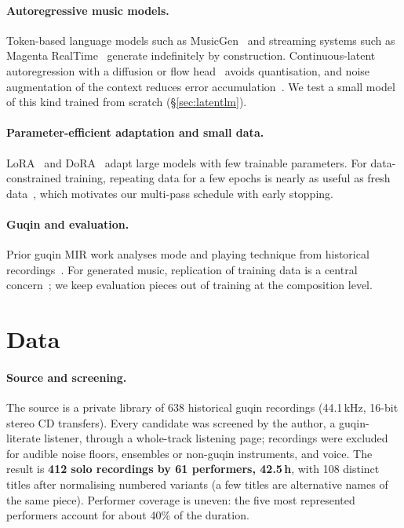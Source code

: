 \documentclass[11pt]{article}
\begin{document}
\paragraph{Autoregressive music models.} Token-based language models such as MusicGen~\citep{copet2023musicgen}
and streaming systems such as Magenta RealTime~\citep{lyria2025live} generate indefinitely by construction.
Continuous-latent autoregression with a diffusion or flow head~\citep{li2024mar} avoids quantisation, and noise
augmentation of the context reduces error accumulation~\citep{pasini2024continuous}. We test a small model of this
kind trained from scratch (\S\ref{sec:latentlm}).

\paragraph{Parameter-efficient adaptation and small data.} LoRA~\citep{hu2021lora} and DoRA~\citep{liu2024dora}
adapt large models with few trainable parameters. For data-constrained training, repeating data for a few
epochs is nearly as useful as fresh data~\citep{muennighoff2023scaling}, which motivates our multi-pass schedule
with early stopping.

\paragraph{Guqin and evaluation.} Prior guqin MIR work analyses mode and playing technique from historical
recordings~\citep{huang2020guqin}. For generated music, replication of training data is a central
concern~\citep{batlleroca2024replication}; we keep evaluation pieces out of training at the composition level.

\section{Data}\label{sec:data}

\paragraph{Source and screening.} The source is a private library of 638 historical guqin recordings
(44.1\,kHz, 16-bit stereo CD transfers). Every candidate was screened by the author, a guqin-literate
listener, through a whole-track listening page; recordings were excluded for audible noise floors, ensembles
or non-guqin instruments, and voice. The result is \textbf{412 solo recordings by 61 performers, 42.5\,h}, with
108 distinct titles after normalising numbered variants (a few titles are alternative names of the same piece). Performer coverage is
uneven: the five most represented performers account for about 40\% of the duration.
\end{document}
